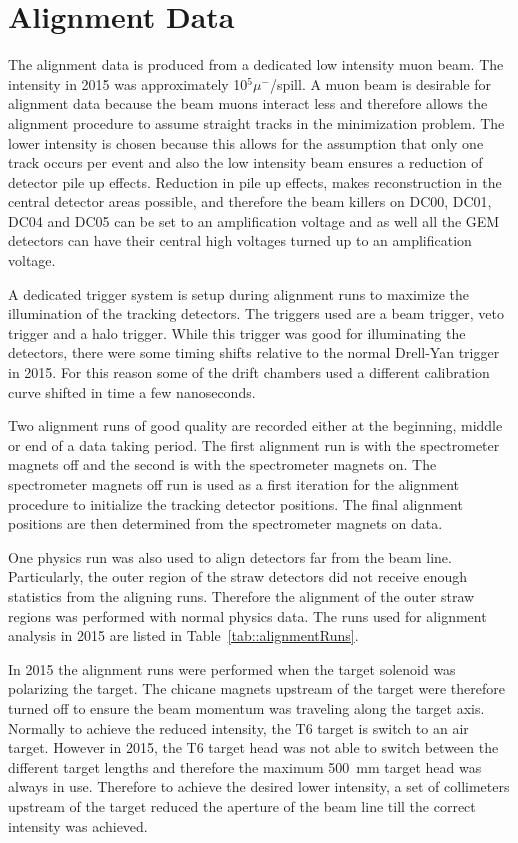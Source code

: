 \section{Alignment Data}

The alignment data is produced from a dedicated low intensity muon beam.  The
intensity in 2015 was approximately 10$^5 \mu^-$/spill.  A muon beam is
desirable for alignment data because the beam muons interact less and therefore
allows the alignment procedure to assume straight tracks in the minimization
problem.  The lower intensity is chosen because this allows for the assumption
that only one track occurs per event and also the low intensity beam ensures a
reduction of detector pile up effects.  Reduction in pile up effects, makes
reconstruction in the central detector areas possible, and therefore the beam
killers on DC00, DC01, DC04 and DC05 can be set to an amplification voltage and
as well all the GEM detectors can have their central high voltages turned up to
an amplification voltage.

A dedicated trigger system is setup during alignment runs to maximize the
illumination of the tracking detectors.  The triggers used are a beam trigger,
veto trigger and a halo trigger.  While this trigger was good for illuminating
the detectors, there were some timing shifts relative to the normal Drell-Yan
trigger in 2015.  For this reason some of the drift chambers used a different
calibration curve shifted in time a few nanoseconds.

Two alignment runs of good quality are recorded either at the beginning, middle
or end of a data taking period.  The first alignment run is with the
spectrometer magnets off and the second is with the spectrometer magnets on.
The spectrometer magnets off run is used as a first iteration for the alignment
procedure to initialize the tracking detector positions.  The final alignment
positions are then determined from the spectrometer magnets on data.  

One physics run was also used to align detectors far from the beam line.
Particularly, the outer region of the straw detectors did not receive enough
statistics from the aligning runs.  Therefore the alignment of the outer straw
regions was performed with normal physics data.  The runs used for alignment
analysis in 2015 are listed in Table~\ref{tab::alignmentRuns}.

In 2015 the alignment runs were performed when the target solenoid was
polarizing the target.  The chicane magnets upstream of the target were
therefore turned off to ensure the beam momentum was traveling along the target
axis.  Normally to achieve the reduced intensity, the T6 target is switch to an
air target.  However in 2015, the T6 target head was not able to switch between
the different target lengths and therefore the maximum 500~mm target head was
always in use.  Therefore to achieve the desired lower intensity, a set of
collimeters upstream of the target reduced the aperture of the beam line till
the correct intensity was achieved.

